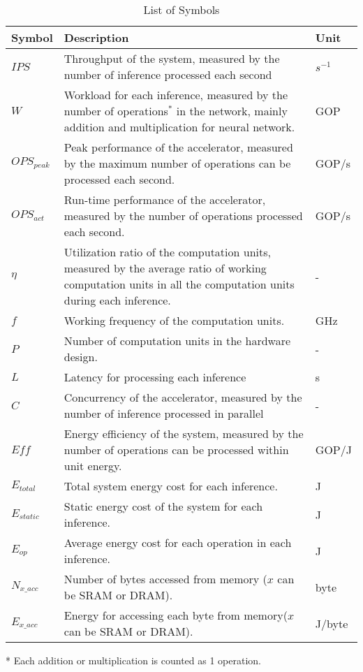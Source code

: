 \begin{table}[htbp]
    \centering
    \begin{threeparttable}
        \caption{List of Symbols}\label{tab:symbol}%
        \begin{tabular}{|l|p{}|l|} \hline
        Symbol & Description & Unit \\ \hline
        $IPS$   & Throughput of the system, measured by the number of inference processed each second & $s^{-1}$ \\ \hline
        $W$     & Workload for each inference, measured by the number of operations$^*$ in the network, mainly addition and multiplication for neural network. & GOP \\ \hline
        $OPS_{peak}$ & Peak performance of the accelerator, measured by the maximum number of operations can be processed each second. & GOP/s \\ \hline
        $OPS_{act}$ & Run-time performance of the accelerator, measured by the number of operations processed each second. & GOP/s \\ \hline
        $\eta$   & Utilization ratio of the computation units, measured by the average ratio of working computation units in all the computation units during each inference. & - \\ \hline
        $f$ & Working frequency of the computation units. & GHz \\ \hline
        $P$ & Number of computation units in the hardware design. & - \\ \hline
        $L$ & Latency for processing each inference & s \\ \hline
        $C$ & Concurrency of the accelerator, measured by the number of inference processed in parallel & - \\ \hline 
        $Eff$   & Energy efficiency of the system, measured by the number of operations can be processed within unit energy. & GOP/J \\ \hline
        $E_{total}$ & Total system energy cost for each inference. & J \\ \hline 
        $E_{static}$ & Static energy cost of the system for each inference. & J \\ \hline
        $E_{op}$ & Average energy cost for each operation in each inference. & J \\ \hline
        $N_{x\_acc}$ & Number of bytes accessed from memory ($x$ can be SRAM or DRAM). & byte \\ \hline
        $E_{x\_acc}$ & Energy for accessing each byte from memory($x$ can be SRAM or DRAM). & J/byte \\ \hline
        \end{tabular}%
        \begin{tablenotes}
            \item[*] Each addition or multiplication is counted as 1 operation.
        \end{tablenotes}
    \end{threeparttable}
\end{table}%
